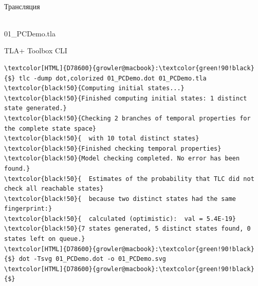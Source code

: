 \documentclass[
  11pt,aspectratio=1610,pdf,hyperref={unicode,colorlinks=false}
]{beamer}
\begin{document}
\begin{frame}[t,fragile]
  \vspace{1ex}\\
  \strut{}Трансляция\\%
  \begin{minipage}{\textwidth}%
  \end{minipage}
\end{frame}

\begin{frame}[c]
  \\[2ex]%
  {\normalsize\ttfamily\textcolor{black!80}{01\_PCDemo.tla}}
\end{frame}

\begin{frame}[c,fragile]
  {\centering\Large TLA+ Toolbox CLI\\}
  \begin{tcolorbox}[colback=shellbgcolor,boxrule=.25pt]%
    \scriptsize%
    \begin{Verbatim}[commandchars=\\\{\}]
\textcolor[HTML]{D78600}{growler@macbook}:\textcolor{green!90!black}{$} tlc -dump dot,colorized 01_PCDemo.dot 01_PCDemo.tla
\textcolor{black!50}{Computing initial states...}
\textcolor{black!50}{Finished computing initial states: 1 distinct state generated.}
\textcolor{black!50}{Checking 2 branches of temporal properties for the complete state space}
\textcolor{black!50}{  with 10 total distinct states}
\textcolor{black!50}{Finished checking temporal properties}
\textcolor{black!50}{Model checking completed. No error has been found.}
\textcolor{black!50}{  Estimates of the probability that TLC did not check all reachable states}
\textcolor{black!50}{  because two distinct states had the same fingerprint:}
\textcolor{black!50}{  calculated (optimistic):  val = 5.4E-19}
\textcolor{black!50}{7 states generated, 5 distinct states found, 0 states left on queue.}
\textcolor[HTML]{D78600}{growler@macbook}:\textcolor{green!90!black}{$} dot -Tsvg 01_PCDemo.dot -o 01_PCDemo.svg
\textcolor[HTML]{D78600}{growler@macbook}:\textcolor{green!90!black}{$}
    \end{Verbatim}
  \end{tcolorbox}
\end{frame}
\end{document}
